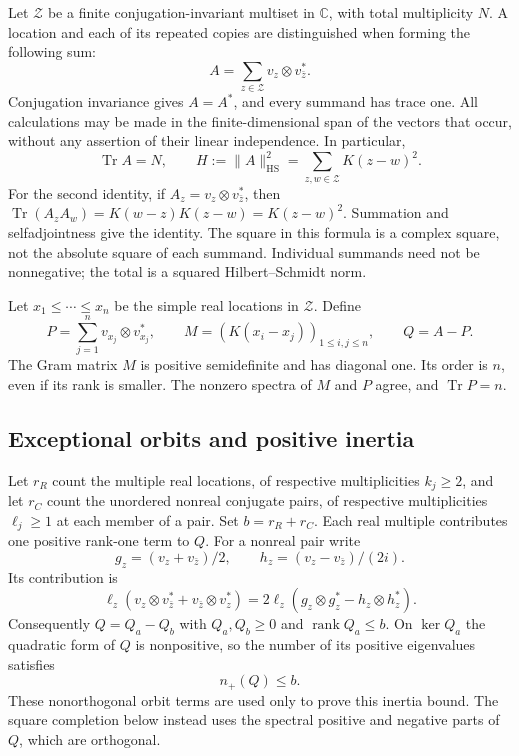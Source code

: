 \documentclass[11pt]{amsart}
\numberwithin{equation}{section}
\newcommand{\C}{\mathbb C}
\newcommand{\Tr}{\operatorname{Tr}}
\newcommand{\rank}{\operatorname{rank}}
\newcommand{\HS}{\mathrm{HS}}
\begin{document}
Let $\mathcal Z$ be a finite conjugation-invariant multiset in $\C$, with
total multiplicity $N$. A location and each of its repeated copies are
distinguished when forming the following sum:
\begin{equation}
 A=\sum_{z\in\mathcal Z}v_z\otimes v_{\bar z}^{*}.
 \label{eq:A}
\end{equation}
Conjugation invariance gives $A=A^*$, and every summand has trace one.
All calculations may be made in the finite-dimensional span of the vectors
that occur, without any assertion of their linear independence. In
particular,
\begin{equation}
 \Tr A=N,\qquad
 H:=\|A\|_\HS^2=\sum_{z,w\in\mathcal Z}K(z-w)^2.
 \label{eq:traceenergy}
\end{equation}
For the second identity, if $A_z=v_z\otimes v_{\bar z}^*$, then
$\Tr(A_zA_w)=K(w-z)K(z-w)=K(z-w)^2$. Summation and selfadjointness
give the identity. The square in this formula is a complex square, not
the absolute square of each summand. Individual summands need not be
nonnegative; the total is a squared Hilbert--Schmidt norm.

Let $x_1\le\cdots\le x_n$ be the simple real locations in $\mathcal Z$.
Define
\begin{equation}
 P=\sum_{j=1}^n v_{x_j}\otimes v_{x_j}^*,\qquad
 M=(K(x_i-x_j))_{1\le i,j\le n},\qquad Q=A-P.
 \label{eq:simpleblock}
\end{equation}
The Gram matrix $M$ is positive semidefinite and has diagonal one. Its
order is $n$, even if its rank is smaller. The nonzero spectra of $M$
and $P$ agree, and $\Tr P=n$.

\subsection{Exceptional orbits and positive inertia}

Let $r_R$ count the multiple real locations, of respective multiplicities
$k_j\ge2$, and let $r_C$ count the unordered nonreal conjugate pairs,
of respective multiplicities $\ell_j\ge1$ at each member of a pair.
Set $b=r_R+r_C$. Each real multiple contributes one positive rank-one
term to $Q$. For a nonreal pair write
\[
 g_z=(v_z+v_{\bar z})/2,\qquad
 h_z=(v_z-v_{\bar z})/(2i).
\]
Its contribution is
\[
 \ell_z(v_z\otimes v_{\bar z}^*+v_{\bar z}\otimes v_z^*)
 =2\ell_z(g_z\otimes g_z^*-h_z\otimes h_z^*).
\]
Consequently $Q=Q_a-Q_b$ with $Q_a,Q_b\ge0$ and $\rank Q_a\le b$.
On $\ker Q_a$ the quadratic form of $Q$ is nonpositive, so the number
of its positive eigenvalues satisfies
\begin{equation}
 n_+(Q)\le b.\label{eq:inertia}
\end{equation}
These nonorthogonal orbit terms are used only to prove this inertia
bound. The square completion below instead uses the spectral positive
and negative parts of $Q$, which are orthogonal.
\end{document}
